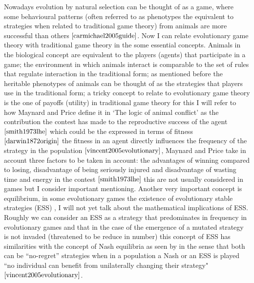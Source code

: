 \documentclass{book}
\begin{document}
Nowadays evolution by natural selection can be thought of as a game, where some behavioural patterns (often referred to as phenotypes the equivalent to strategies when related to traditional game theory) from animals are more successful than others $\cite{carmichael2005guide}$. Now I can relate evolutionary game theory with traditional game theory in the some essential concepts. Animals in the biological concept are equivalent to the players (agents) that participate in a game; the environment in which animals interact is comparable to the set of rules that regulate interaction in the traditional form; as mentioned before the heritable phenotypes of animals can be thought of as the strategies that players use in the traditional form; a tricky concept to relate to evolutionary game theory is the one of payoffs (utility) in traditional game theory  for this I will refer to how Maynard and Price define it in ‘The logic of animal conflict’ as the contribution the contest has made to the reproductive success of the agent $\cite{smith1973lhe}$ which could be the expressed in terms of fitness  $\cite{darwin1872origin}$ the fitness in an agent directly influences the frequency of the strategy in the population $\cite{vincent2005evolutionary}$, Maynard and Price take in account three factors to be taken in account: the advantages of winning compared to losing, disadvantage of being seriously injured and disadvantage of wasting time and energy in the contest $\cite{smith1973lhe}$ this are not usually considered in games but I consider important mentioning. Another very important concept is equilibrium, in some evolutionary games the existence of evolutionary stable strategies (ESS) , I will not yet talk about the mathematical implications of  ESS. Roughly we can consider an ESS as a strategy that predominates in frequency in evolutionary games and that in the case of the emergence of a mutated strategy is not invaded (threatened to be reduce in number) this concept of ESS has similarities with the concept of Nash equilibria as seen by in the sense that both can be ``no-regret'' strategies when in a population a Nash or an ESS is played ``no individual can benefit from unilaterally changing their strategy" $\cite{vincent2005evolutionary}$.  
\end{document}
